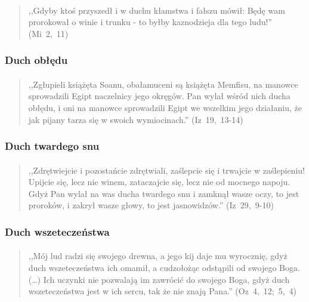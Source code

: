 \documentclass[10pt,a4paper,oneside]{article}
\begin{document}
\paragraph{}
\begin{quote}
,,Gdyby ktoś przyszedł i w duchu kłamstwa i fałszu mówił: Będę wam prorokował o winie i trunku - to byłby kaznodzieja dla tego ludu!'' \mbox{(Mi 2, 11)}
\end{quote}
\subsubsection{Duch obłędu}
\paragraph{}
\begin{quote}
,,Zgłupieli książęta Soanu, obałamuceni są książęta Memfisu, na manowce sprowadzili Egipt naczelnicy jego okręgów. Pan wylał wśród nich ducha obłędu, i oni na manowce sprowadzili Egipt we wszelkim jego działaniu, że jak pijany tarza się w swoich wymiocinach.'' \mbox{(Iz 19, 13-14)}
\end{quote}
\subsubsection{Duch twardego snu}
\paragraph{}
\begin{quote}
,,Zdrętwiejcie i pozostańcie zdrętwiali, zaślepcie się i trwajcie w zaślepieniu! Upijcie się, lecz nie winem, zataczajcie się, lecz nie od mocnego napoju. Gdyż Pan wylał na was ducha twardego snu i zamknął wasze oczy, to jest proroków, i zakrył wasze głowy, to jest jasnowidzów.'' \mbox{(Iz 29, 9-10)}
\end{quote}
\subsubsection{Duch wszeteczeństwa}
\paragraph{}
\begin{quote}
,,Mój lud radzi się swojego drewna, a jego kij daje mu wyrocznię, gdyż duch wszeteczeństwa ich omamił, a cudzołożąc odstąpili od swojego Boga. (\ldots) Ich uczynki nie pozwalają im zawrócić do swojego Boga, gdyż duch wszeteczeństwa jest w ich sercu, tak że nie znają Pana.'' \mbox{(Oz 4, 12; 5, 4)}
\end{quote}
\end{document}
